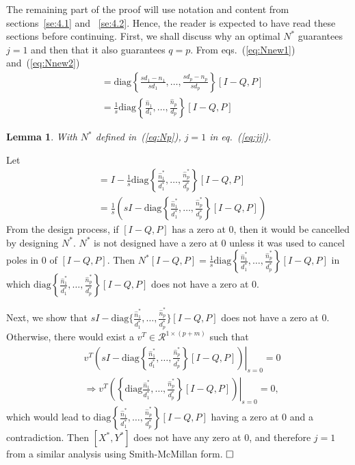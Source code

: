 \documentclass[twocolumn,12pt]{autart}
\theoremstyle{plain}
\newtheorem{lemma}{Lemma}
\newenvironment{proof}[1][Proof]{\begin{trivlist} \item[\hskip \labelsep {\bfseries #1}]}{\end{trivlist}}
\begin{document}
The remaining part of the proof will use notation and content from sections~\ref{se:4.1} and ~\ref{se:4.2}. Hence, the reader is expected to have read these sections before continuing.  First, we shall discuss why an optimal $N^*$ guarantees $j=1$ and then that it also guarantees $q=p$. From eqs.~(\ref{eq:Nnew1}) and~(\ref{eq:Nnew2})
\begin{align}
[I-X,Y]&=\text{diag}\left\{\frac{sd_1-n_1}{sd_1},\ldots,\frac{sd_p-n_p}{sd_p}\right\}[I-Q,P]\nonumber\\ &=\frac{1}{s}\text{diag}\left\{\frac{\hat{n}_1}{d_1},\ldots,\frac{\hat{n}_p}{d_p}\right\}[I-Q,P]
\label{eq:guarantee}
\end{align}




\begin{lemma}
With $N^*$ defined in~(\ref{eq:Np}), $j=1$ in eq.~(\ref{eq:jj}).
\end{lemma}
\begin{proof}
Let\begin{align}
[X^*,Y^*]&= I-\frac{1}{s}\text{diag}\left\{\frac{\hat{n}^*_1}{d^*_1},\ldots,\frac{\hat{n}^*_p}{d^*_p}\right\}[I-Q,P]\\
&=\frac{1}{s}\left(sI-\text{diag}\left\{\frac{\hat{n}^*_1}{d^*_1},\ldots,\frac{\hat{n}^*_p}{d^*_p}\right\}[I-Q,P]\right)\label{eq:xystar}
\end{align}
From the design process, if $[I-Q,P]$ has a zero at $0$, then it would be cancelled by designing $N^*$. $N^*$ is not designed have a zero at $0$ unless it was used to cancel poles in $0$ of $[I-Q,P]$. Then $N^*[I-Q,P]=\frac{1}{s}\text{diag}\left\{\frac{\hat{n}^*_1}{d^*_1},\ldots,\frac{\hat{n}^*_p}{d^*_p}\right\}[I-Q,P]$ in which $\text{diag}\left\{\frac{\hat{n}^*_1}{d^*_1},\ldots,\frac{\hat{n}^*_p}{d^*_p}\right\}[I-Q,P]$ does not have a zero at $0$.

Next, we show that $sI-\text{diag}\{\frac{\hat{n}^*_1}{d^*_1},\ldots,\frac{\hat{n}^*_p}{d^*_p}\}[I-Q,P]$ does not have a zero at $0$. Otherwise, there would exist a $v^T\in\mathcal{R}^{1\times (p+m)}$ such that 
\begin{align}
&\left. v^T\left(sI-\text{diag}\left\{\frac{\hat{n}^*_1}{d^*_1},\ldots,\frac{\hat{n}^*_p}{d^*_p}\right\}[I-Q,P]\right)\right\vert_{s=0}=0\\
&\left. \Rightarrow v^T\left(\left\{\text{diag}\frac{\hat{n}^*_1}{d^*_1},\ldots,\frac{\hat{n}^*_p}{d^*_p}\right\}[I-Q,P]\right)\right\vert_{s=0}=0,
\end{align}
which would lead to $\text{diag}\left\{\frac{\hat{n}^*_1}{d^*_1},\ldots,\frac{\hat{n}^*_p}{d^*_p}\right\}[I-Q,P]$ having a zero at $0$ and a contradiction. Then $[X^*,Y^*]$ does not have any zero at $0$, and therefore $j=1$ from a similar analysis using Smith-McMillan form.
$\hfill \square$
\end{proof}
\end{document}
